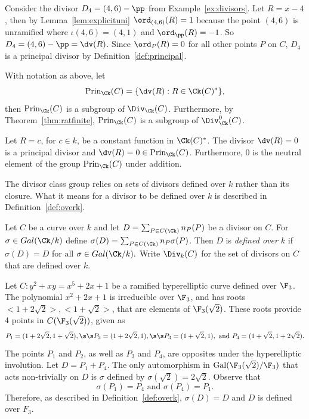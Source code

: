 \be
Consider the divisor $D_4 = (4,6) - \pp$ from Example~\ref{ex:divisors}. Let $R = x
- 4$, then by Lemma~\ref{lem:explicituni} $\ord_{(4,6)}(R) = 1$ because the
point $(4,6)$ is unramified where $\iota(4,6) = (4,1)$ and $\ord_{\pp}(R) = -1$.
So $D_4 = (4,6) - \pp = \dv(R)$. Since $\ord_{P}(R) = 0$ for all other points
$P$ on $C$, $D_4$ is a principal divisor by Definition~\ref{def:principal}.
\ee


\bl\label{lem:subgroup}
\cite[Adapted from Lemma~7.7.6]{Galbraith_PKC_2012} With notation as above, let
$$ \mathrm{Prin}_{\Ck}(C) = \{\dv(R) : R \in {\Ck}(C)^* \},$$ then
$\mathrm{Prin}_{\Ck}(C)$ is a subgroup of $\Div_{\Ck}(C)$.
Furthermore, by Theorem~\ref{thm:ratfinite}, $\mathrm{Prin}_{\Ck}(C)$ is a
subgroup of $\Div^0_{\Ck}(C)$.
\el

\be\label{ex:divzero}
Let $R = c$, for $c \in k$, be a constant function in $\Ck(C)^*$. The divisor
$\dv(R) = 0$ is a principal divisor and $\dv(R) = 0 \in
\mathrm{Prin}_{\Ck}(C)$. Furthermore, $0$ is the neutral element of the group
$\mathrm{Prin}_{\Ck}(C)$ under addition.
\ee

The divisor class group relies on sets of divisors defined over $k$ rather than
its closure. What it means for a divisor to be defined over $k$ is described in
Definition~\ref{def:overk}.

\bd\label{def:overk}
\cite[Adapted from Definition~7.6.6]{Galbraith_PKC_2012} Let $C$ be a curve over
$k$ and let $D = \sum_{P\in C(\Ck)} n_P(P)$ be a divisor on $C$. For $\sigma \in
Gal(\Ck/k)$ define $\sigma(D) = \sum_{P\in C(\Ck)} n_P \sigma(P)$. Then $D$ is
\emph{defined over $k$} if $\sigma(D) = D$ for all $\sigma \in Gal(\Ck/k).$ Write
$\Div_k(C)$ for the set of divisors on $C$ that are defined over $k$.
\ed

\be
Let $C : y^2 + xy = x^5 + 2x + 1$ be a ramified hyperelliptic curve defined over
$\F_3$. The polynomial $x^2 + 2x + 1$ is irreducible over $\F_3$, and has roots
$<1 + 2\sqrt{2}>, <1 + \sqrt{2}>$, that are elements of $\F_3(\sqrt{2})$. These
roots provide 4 points in $C(\F_3(\sqrt{2}))$, given as
$$P_1 = (1 + 2\sqrt{2}, 1 + \sqrt{2}), \s\s P_2 = (1 + 2\sqrt{2}, 1), \s\s P_3 =
(1 + \sqrt{2}, 1),\mbox{ and } P_4 = (1 + \sqrt{2}, 1 + 2\sqrt{2}).$$ The points
$P_1$ and $P_2$, as well as $P_3$ and $P_4$, are opposites under the hyperelliptic
involution. Let $D = P_1 + P_4$. The only automorphism in
$\mathrm{Gal}(\F_3(\sqrt{2})/\F_3)$ that acts non-trivially on $D$ is $\sigma$
defined by $\sigma(\sqrt{2}) = 2\sqrt{2}$. Observe that $$\sigma(P_1) = P_4
\mbox{ and } \sigma(P_4)= P_1.$$ Therefore, as described in Definition~\ref{def:overk},
$\sigma(D) = D$ and $D$ is defined over $F_3$.
\ee

